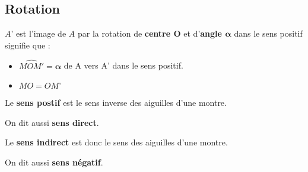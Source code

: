 \subsection{Rotation}
\begin{definition}
    $A’$ est l’image de $A$ par la rotation de \textbf{centre $\mathbf{O}$} et d’\textbf{angle $\mathbf{\alpha}$} dans le sens positif signifie que : 
    \begin{itemize}
        \item $\widehat{MOM'}=\mathbf{\alpha}$ de A vers A’ dans le sens positif.
        \item $MO = OM’$
    \end{itemize}
\end{definition}

\begin{definition}
    Le \textbf{sens postif} est le sens inverse des aiguilles d'une montre.
    
    On dit aussi \textbf{sens direct}.
\end{definition}

\begin{remarque}
    Le \textbf{sens indirect} est donc le sens des aiguilles d'une montre.
    
    On dit aussi \textbf{sens négatif}.
\end{remarque}

